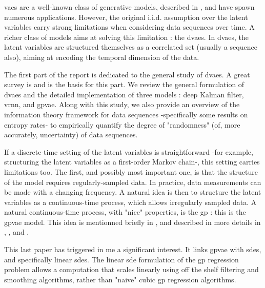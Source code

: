 

\glspl{vae} are a well-known class of generative models, described in \cite{kingma_introduction_2019}, and have spawn numerous applications. However, the original i.i.d.
assumption over the latent variables carry strong limitations when considering data sequences over time. 
A richer class of models aims at solving this limitation : the \glspl{dvae}. In \glspl{dvae}, the latent variables are structured themselves as a correlated set (usually a sequence also),
 aiming at encoding the temporal dimension of the data. 

The first part of the report is dedicated to the general study of \glspl{dvae}. A great survey is \cite{girin_dynamical_2022} and is the basis for this part. 
We review the general formulation of \glspl{dvae} and the detailed implementation of three models : deep Kalman filter, \gls{vrnn}, and \gls{gpvae}. 
Along with this study, we also provide an overview of the information theory framework for data sequences -specifically some results on entropy rates-
 to empirically  quantify the degree of "randomness" (of, more accurately, uncertainty) of data sequences.

If a discrete-time setting of the latent variables is straightforward -for example, structuring the latent variables as a first-order Markov chain-, this setting carries limitations too. 
The first, and possibly most important one, is that the structure of the model requires regularly-sampled data. In practice, data measurements can be made 
with a changing frequency. A natural idea is then to structure the latent variables as a continuous-time process, which allows irregularly sampled data. 
A natural continuous-time process, with "nice" properties, is the \gls{gp} \cite{rasmussen_gaussian_2008} : this is the \gls{gpvae} model. 
This idea is mentionned briefly in \cite{girin_dynamical_2022}, and described in more details in \cite{casale_gaussian_2018}, \cite{fortuin_gp-vae:_2020}, \cite{titsias_bayesian_2010} and \cite{zhu_markovian_2023}. 

This last paper \cite{zhu_markovian_2023} has triggered in me a significant interest. It links \gls{gpvae} with \glspl{sde}, and specifically linear \glspl{sde}. 
The linear \gls{sde} formulation of the \gls{gp} regression problem allows a computation that scales linearly using off the shelf filtering and smoothing algorithms,
rather than "naive" cubic \gls{gp} regression algorithms. 

